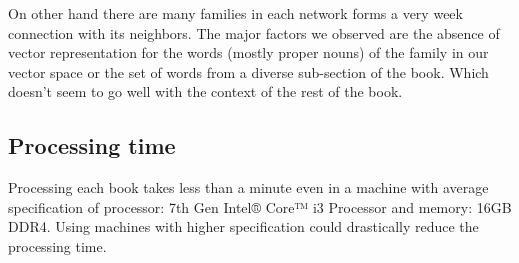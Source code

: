 \documentclass[11pt,a4paper]{article}
\begin{document}
On other hand there are many families in each network forms a very week connection with its neighbors. The major factors we observed are the absence of vector representation for the words (mostly proper nouns) of the family in our vector space or the set of words from a diverse sub-section of the book. Which doesn't seem to go well with the context of the rest of the book.

\subsection{Processing time}
Processing each book takes less than a minute even in a machine with average specification of processor: 7th Gen Intel® Core™ i3 Processor and memory: 16GB DDR4. Using machines with higher specification could drastically reduce the processing time.
\begin{figure}[p!]
  \centering
  \hspace{0mm}
\end{figure}
\end{document}
